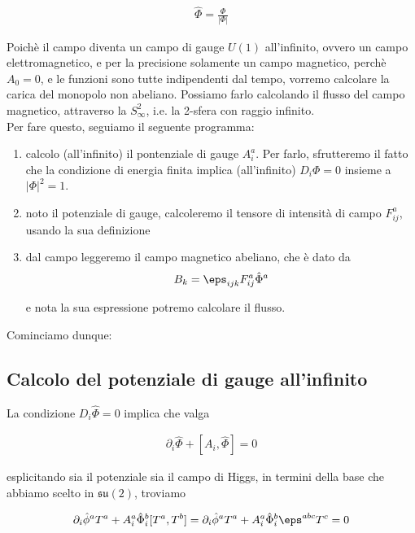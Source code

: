\documentclass{report}
\begin{document}
\begin{align}
    \hat{\Phi} = \frac{\Phi}{|\Phi|}
\end{align}

Poichè il campo diventa un campo di gauge \(U(1)\) all'infinito, ovvero un campo elettromagnetico, e per la precisione solamente un campo magnetico, perchè \(A_0 = 0\), e le funzioni sono tutte indipendenti dal tempo, vorremo calcolare la carica del monopolo non abeliano. Possiamo farlo calcolando il flusso del campo magnetico, attraverso la \(S^2_{\infty}\), i.e. la 2-sfera con raggio infinito. \\

Per fare questo, seguiamo il seguente programma: 

\begin{enumerate}
    \item calcolo (all'infinito) il pontenziale di gauge \(A^a_i\). Per farlo, sfrutteremo il fatto che la condizione di energia finita implica (all'infinito) \(D_i \Phi = 0\) insieme a \(|\Phi|^2 = 1\). 
    \item noto il potenziale di gauge, calcoleremo il tensore di intensità di campo \(F^a_{ij}\), usando la sua definizione 
    \item dal campo leggeremo il campo magnetico abeliano, che è dato da
    \begin{align}
        B_k = \eps_{ijk}F^a_{ij}\hat{\Phi}^a
    \end{align}

    e nota la sua espressione potremo calcolare il flusso. 
\end{enumerate}

Cominciamo dunque: 

\subsection{Calcolo del potenziale di gauge all'infinito}

La condizione \(D_i \hat{\Phi} = 0\) implica che valga 

\begin{align}
    \partial_i\hat{\Phi} + [A_i, \hat{\Phi}] = 0 
\end{align}

esplicitando sia il potenziale sia il campo di Higgs, in termini della base che abbiamo scelto in \(\mathfrak{su}(2)\), troviamo 

\begin{align}
    \partial_i \hat{\phi}^a T^a + A^a_i \hat{\Phi}^b_i [T^a, T^b] = \partial_i \hat{\phi}^a T^a + A^a_i \hat{\Phi}^b_i \eps^{abc} T^c = 0  
\end{align}
\end{document}

